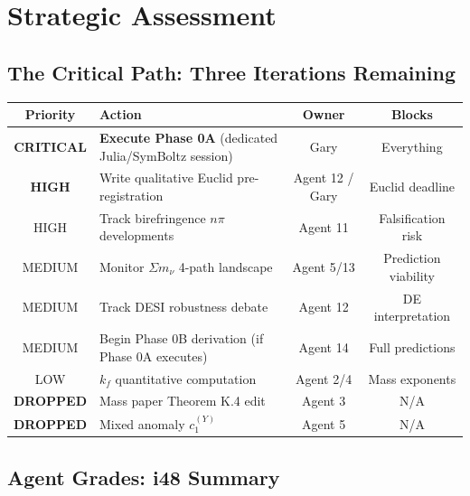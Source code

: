 \documentclass[11pt,a4paper]{article}
\begin{document}
\section{Strategic Assessment}

\subsection{The Critical Path: Three Iterations Remaining}

\begin{center}
\begin{tabular}{clcc}
\toprule
\textbf{Priority} & \textbf{Action} & \textbf{Owner} & \textbf{Blocks} \\
\midrule
\textbf{CRITICAL} & \textbf{Execute Phase 0A} (dedicated Julia/SymBoltz session) & Gary & Everything \\
\textbf{HIGH} & Write qualitative Euclid pre-registration & Agent 12 / Gary & Euclid deadline \\
HIGH & Track birefringence $n\pi$ developments & Agent 11 & Falsification risk \\
MEDIUM & Monitor $\Sigma m_\nu$ 4-path landscape & Agent 5/13 & Prediction viability \\
MEDIUM & Track DESI robustness debate & Agent 12 & DE interpretation \\
MEDIUM & Begin Phase 0B derivation (if Phase 0A executes) & Agent 14 & Full predictions \\
LOW & $k_f$ quantitative computation & Agent 2/4 & Mass exponents \\
\textbf{DROPPED} & Mass paper Theorem K.4 edit & Agent 3 & N/A \\
\textbf{DROPPED} & Mixed anomaly $c_1^{(Y)}$ & Agent 5 & N/A \\
\bottomrule
\end{tabular}
\end{center}

\subsection{Agent Grades: i48 Summary}
\end{document}

